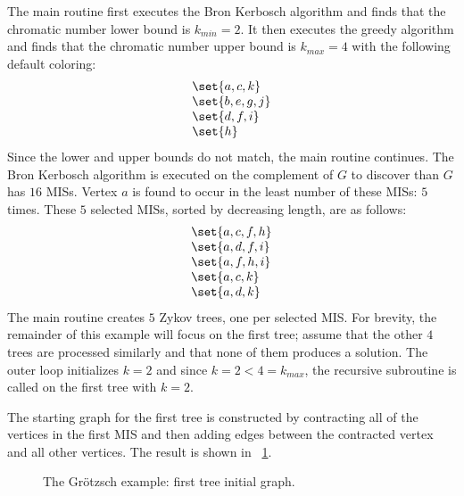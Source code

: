 The main routine first executes the Bron Kerbosch algorithm and finds that the chromatic number lower bound is
\(k_{min}=2\).  It then executes the greedy algorithm and finds that the chromatic number upper bound is
\(k_{max}=4\) with the following default coloring:
\[\begin{array}{l}
  \set{a, c, k} \\
  \set{b, e, g, j} \\
  \set{d, f, i} \\
  \set{h}
\end{array}\]
Since the lower and upper bounds do not match, the main routine continues.  The Bron Kerbosch algorithm is executed
on the complement of \(G\) to discover than \(G\) has \(16\) MISs.  Vertex \(a\) is found to occur in the least
number of these MISs: \(5\) times.  These \(5\) selected MISs, sorted by decreasing length, are as follows:
\[\begin{array}{l}
  \set{a, c, f, h} \\
  \set{a, d, f, i} \\
  \set{a, f, h, i} \\
  \set{a, c, k} \\
  \set{a, d, k}
\end{array}\]
The main routine creates \(5\) Zykov trees, one per selected MIS.  For brevity, the remainder of this example will
focus on the first tree; assume that the other \(4\) trees are processed similarly and that none of them produces a
solution.  The outer loop initializes \(k=2\) and since \(k=2<4=k_{max}\), the recursive subroutine is called on
the first tree with \(k=2\).

The starting graph for the first tree is constructed by contracting all of the vertices in the first MIS and then
adding edges between the contracted vertex and all other vertices.  The result is shown in
\figurename~\ref{fig:ex:ginit}.

\begin{figure}[H]
  \centering
  \caption{The Gr\"otzsch example: first tree initial graph.}
  \label{fig:ex:ginit}
\end{figure}

